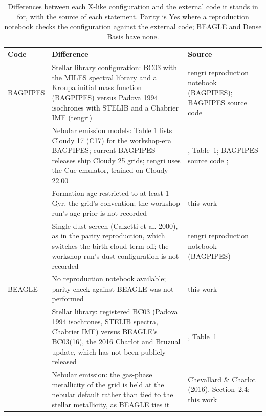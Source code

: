 \begin{table}[!t]
\centering
\caption{Differences between each X-like configuration and the external code it stands in for, with the source of each statement. Parity is Yes where a reproduction notebook checks the configuration against the external code; BEAGLE and Dense Basis have none.}
\label{tab:xlike_differences}
\scriptsize
\setlength{\tabcolsep}{4pt}
\begin{tabular}{@{}lll@{}}
\toprule
Code & Difference & Source \\
\midrule
BAGPIPES & \parbox[t]{9.6cm}{\raggedright Stellar library configuration: BC03 with the MILES spectral library and a Kroupa initial mass function (BAGPIPES) versus Padova 1994 isochrones with STELIB and a Chabrier IMF (tengri)} & \parbox[t]{4.6cm}{\raggedright tengri reproduction notebook (BAGPIPES); BAGPIPES source code \citep{Carnall_2018}} \\
 & \parbox[t]{9.6cm}{\raggedright Nebular emission models: Table 1 lists Cloudy 17 (C17) for the workshop-era BAGPIPES; current BAGPIPES releases ship Cloudy 25 grids; tengri uses the Cue emulator, trained on Cloudy 22.00} & \parbox[t]{4.6cm}{\raggedright \citet{Pacifici_2023}, Table~1; BAGPIPES source code \citep{Carnall_2018}; \citet{Li_2025}} \\
 & \parbox[t]{9.6cm}{\raggedright Formation age restricted to at least 1 Gyr, the grid's convention; the workshop run's age prior is not recorded} & \parbox[t]{4.6cm}{\raggedright this work} \\
 & \parbox[t]{9.6cm}{\raggedright Single dust screen (Calzetti et al. 2000), as in the parity reproduction, which switches the birth-cloud term off; the workshop run's dust configuration is not recorded} & \parbox[t]{4.6cm}{\raggedright tengri reproduction notebook (BAGPIPES)} \\
\midrule
BEAGLE & \parbox[t]{9.6cm}{\raggedright No reproduction notebook available; parity check against BEAGLE was not performed} & \parbox[t]{4.6cm}{\raggedright this work} \\
 & \parbox[t]{9.6cm}{\raggedright Stellar library: registered BC03 (Padova 1994 isochrones, STELIB spectra, Chabrier IMF) versus BEAGLE's BC03(16), the 2016 Charlot and Bruzual update, which has not been publicly released} & \parbox[t]{4.6cm}{\raggedright \citet{Pacifici_2023}, Table~1} \\
 & \parbox[t]{9.6cm}{\raggedright Nebular emission: the gas-phase metallicity of the grid is held at the nebular default rather than tied to the stellar metallicity, as BEAGLE ties it} & \parbox[t]{4.6cm}{\raggedright Chevallard \& Charlot (2016), Section~2.4; this work} \\

\end{tabular}
\end{table}
